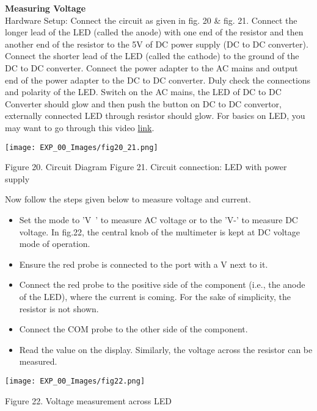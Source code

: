 \documentclass[12pt,a4paper]{article}
\begin{document}
\begin{justify}
\noindent \textbf{Measuring Voltage }\\[3pt]
\noindent Hardware Setup: Connect the circuit as given in fig. 20 \& fig. 21. Connect the longer lead of the LED (called the anode) with one end of the resistor and then another end of the resistor to the 5V of DC power supply (DC to DC converter). Connect the shorter lead of the LED (called the cathode) to the ground of the DC to DC converter. Connect the power adapter to the AC mains and output end of the power adapter to the DC to DC converter. Duly check the connections and polarity of the LED. Switch on the AC mains, the LED of DC to DC Converter should glow and then push the button on DC to DC convertor, externally connected LED through resistor should glow. For basics on LED, you may want to go through this video \href{https://www.youtube.com/watch?v=Yo6JI_bzUzo}{link}. 

\begin{center} 
\texttt{[image: EXP\_00\_Images/fig20\_21.png]}
\end{center}
\vspace{-8mm}
\begin{center} {Figure 20. Circuit Diagram \hspace{5mm} Figure 21. Circuit connection: LED with power supply}\end{center}
\vspace{-5mm}
\noindent Now follow the steps given below to measure voltage and current.\\
 \vspace{-10mm}
\begin{itemize}
 \setlength\itemsep{-0.3em}
\item Set the mode to 'V~' to measure AC voltage or to the 'V-' to measure DC voltage. In fig.22, the central knob of the multimeter is kept at DC voltage mode of operation.
\item Ensure the red probe is connected to the port with a V next to it.
\item Connect the red probe to the positive side of the component (i.e., the anode of the LED), where the current is coming. For the sake of simplicity, the resistor is not shown.
\item Connect the COM probe to the other side of the component.
\item Read the value on the display. Similarly, the voltage across the resistor can be measured.
\end{itemize}

\begin{center} 
\texttt{[image: EXP\_00\_Images/fig22.png]}
\end{center}
\vspace{-8mm}
\begin{center} {Figure 22. Voltage measurement across LED}\end{center}


\end{justify}
\end{document}
